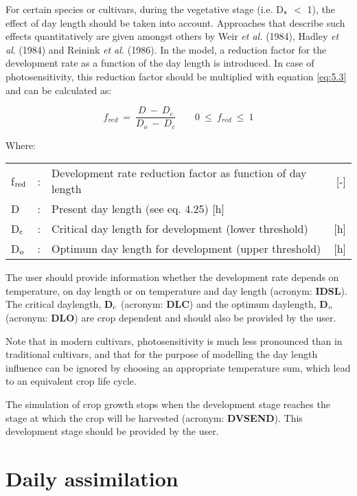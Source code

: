 For certain species or cultivars, during the vegetative stage (i.e. D$_{{\rm s}}$ $<$ 1), the 
effect of day length should be taken into account. Approaches that describe such effects 
quantitatively are given amongst others by  Weir {\it et al.} (1984), Hadley {\it et al}. (1984) 
and Reinink {\it et al.} (1986). In the model, a reduction factor for the development rate as a 
function of the day length is introduced. In case of photosensitivity, this reduction factor 
should be multiplied with equation \ref{eq:5.3} and can be calculated as:

\begin{equation}
\label{eq:5.3}
f_{red} ~=~{\frac{D ~-~D _{c} }{D _{o} ~-~ D _{c} }} ~~~~~~~~~0~\le ~f _{red} ~\le ~1
\end{equation}

Where:\\[5pt]
\begin{tabularx}{\textwidth}{llXr}
f$_{{\rm red}}$ &:& Development rate reduction factor as function of day length   &     [-]\\
D &:& Present day length (see eq. 4.25)        [h]\\
D$_{{\rm c}}$ &:& Critical day length for development (lower threshold)    &    [h]\\
D$_{{\rm o}}$ &:& Optimum day length for development (upper threshold)    &    [h]\\
\end{tabularx}

The user should provide information whether the development rate depends on temperature, 
on day length or on temperature and day length (acronym: {\bf IDSL}). The critical
daylength, {\bf D$_{{\rm c}}$} (acronym: {\bf DLC}) and the optimum daylength, 
{\bf D$_{{\rm o}}$} (acronym: {\bf DLO}) are crop dependent and should also be provided by 
the user. 

Note that in modern cultivars, photosensitivity is much less pronounced than in traditional
cultivars, and that for the purpose of modelling the day length influence can be ignored
by choosing an appropriate temperature sum, which lead to  an equivalent crop life cycle.

The simulation of crop growth stops when the development stage reaches the stage at
which the crop will be harvested (acronym: {\bf DVSEND}). This development stage should be
provided by the user. 

\section{Daily assimilation  } 

